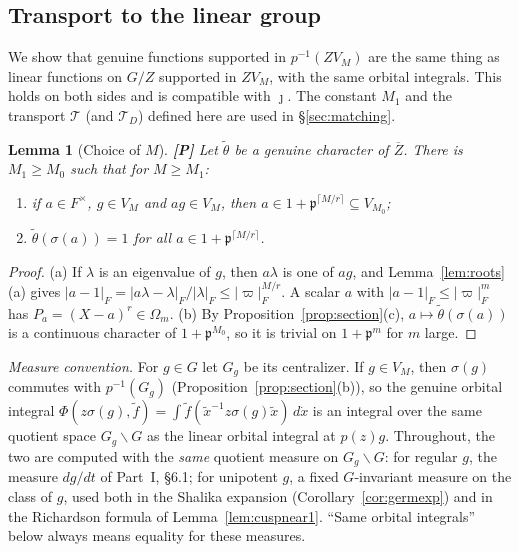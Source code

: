 \documentclass[12pt]{article}
\newcommand{\ov}[1]{\overline{#1}}
\newcommand{\fp}{\mathfrak{p}}
\newcommand{\Zb}{\ov{Z}}
\newcommand{\jj}{\jmath}
\newcommand{\sg}{\sigma}
\newcommand{\Pv}{\textbf{[P]}}
\theoremstyle{plain}
\newtheorem{lemma}[theorem]{Lemma}
\theoremstyle{definition}
\begin{document}
\subsection{Transport to the linear group}\label{subsec:transport}
We show that genuine functions supported in $p^{-1}(ZV_M)$ are the same thing as linear functions on $G/Z$ supported in $ZV_M$, with the same orbital integrals. This holds on both sides and is compatible with $\jj$. The constant $M_1$ and the transport $\mathcal T$ (and $\mathcal T_D$) defined here are used in \S\ref{sec:matching}.

\begin{lemma}[Choice of $M$]\label{lem:chooseM}\Pv
Let $\tilde\theta$ be a genuine character of $\Zb$. There is $M_1\ge M_0$ such that for $M\ge M_1$:
\begin{enumerate}[label=(\alph*)]
\item if $a\in F^\times$, $g\in V_M$ and $ag\in V_M$, then $a\in1+\fp^{\lceil M/r\rceil}\subseteq V_{M_0}$;
\item $\tilde\theta(\sg(a))=1$ for all $a\in1+\fp^{\lceil M/r\rceil}$.
\end{enumerate}
\end{lemma}
\begin{proof}
(a) If $\lambda$ is an eigenvalue of $g$, then $a\lambda$ is one of $ag$, and Lemma~\ref{lem:roots}(a) gives $|a-1|_F=|a\lambda-\lambda|_F/|\lambda|_F\le|\varpi|_F^{M/r}$. A scalar $a$ with $|a-1|_F\le|\varpi|_F^m$ has $P_a=(X-a)^r\in\Omega_m$. (b) By Proposition~\ref{prop:section}(c), $a\mapsto\tilde\theta(\sg(a))$ is a continuous character of $1+\fp^{M_0}$, so it is trivial on $1+\fp^m$ for $m$ large.
\end{proof}

\emph{Measure convention.} For $g\in G$ let $G_g$ be its centralizer. If $g\in V_M$, then $\sg(g)$ commutes with $p^{-1}(G_g)$ (Proposition~\ref{prop:section}(b)), so the genuine orbital integral $\Phi(z\sg(g),\tilde f)=\int\tilde f(\tilde x^{-1}z\sg(g)\tilde x)\,d\dot x$ is an integral over the same quotient space $G_g\backslash G$ as the linear orbital integral at $p(z)g$. Throughout, the two are computed with the \emph{same} quotient measure on $G_g\backslash G$: for regular $g$, the measure $dg/dt$ of Part~I, \S6.1; for unipotent $g$, a fixed $G$-invariant measure on the class of $g$, used both in the Shalika expansion (Corollary~\ref{cor:germexp}) and in the Richardson formula of Lemma~\ref{lem:cuspnear1}. ``Same orbital integrals'' below always means equality for these measures.
\end{document}
